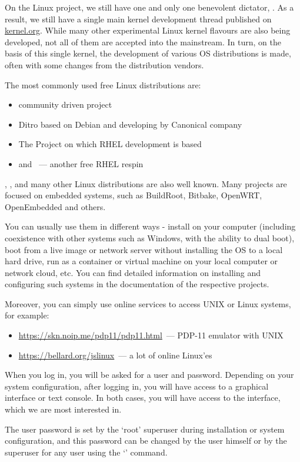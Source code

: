 On the Linux project, we still have one and only one benevolent dictator,
. As a result, we still have a single main kernel
development thread published on \url{kernel.org}. While many other experimental
Linux kernel flavours are also being developed, not all of them are
accepted into the mainstream. In turn, on the basis of this single
kernel, the development of various OS distributions is made, often with
some changes from the distribution vendors.

The most commonly used free Linux distributions are:
\begin{itemize}
\item community driven  project
\item {} Ditro based on Debian and developing by Canonical company
\item The  Project on which RHEL development is based
\item and ~--- another free RHEL respin
\end{itemize}
, ,  and many other Linux
distributions are also well known. Many projects are focused on embedded systems,
such as BuildRoot, Bitbake, OpenWRT, OpenEmbedded and others.

You can usually use them in different ways - install on your computer
(including coexistence with other systems such as Windows, with the ability
to dual boot), boot from a live image or network server without installing
the OS to a local hard drive, run as a container or virtual machine on your
local computer or network cloud, etc. You can find detailed information
on installing and configuring such systems in the documentation of
the respective projects.

Moreover, you can simply use online services to access UNIX or Linux
systems, for example:
\begin{itemize}
\item \href{https://skn.noip.me/pdp11/pdp11.html}%
      {\url{https://skn.noip.me/pdp11/pdp11.html}}~--- PDP-11 emulator with UNIX
\item \href{https://bellard.org/jslinux}{\url{https://bellard.org/jslinux}}~---
      a lot of online Linux'es
\end{itemize}

When you log in, you will be asked for a user and password. Depending on
your system configuration, after logging in, you will have access to
a graphical interface or text console. In both cases, you will have access
to the  interface, which we are most interested in.

The user password is set by the `root' superuser during installation or
system configuration, and this password can be changed by the user
himself or by the superuser for any user using the `' command.
